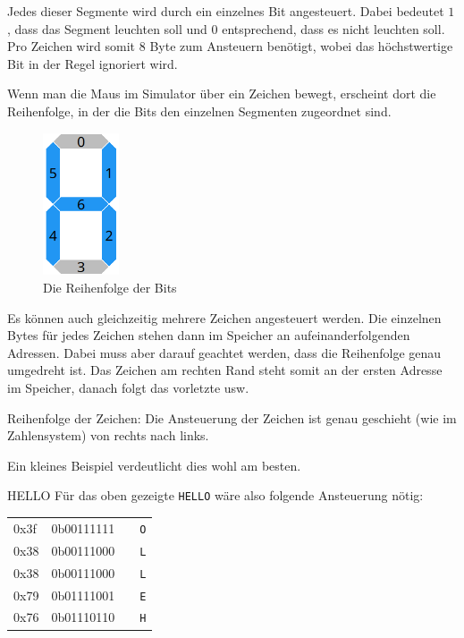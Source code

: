 Jedes dieser Segmente wird durch ein einzelnes Bit angesteuert. Dabei bedeutet $1$, dass das Segment leuchten soll und $0$ entsprechend, dass es nicht leuchten soll.
Pro Zeichen wird somit 8 Byte zum Ansteuern benötigt, wobei das höchstwertige Bit in der Regel ignoriert wird.

Wenn man die Maus im Simulator über ein Zeichen bewegt, erscheint dort die Reihenfolge, in der die Bits den einzelnen Segmenten zugeordnet sind.

\begin{figure}[ht]
	\centering
  \includegraphics[width=0.2\textwidth]{Images/7-Segment_Hover}
	\caption{Die Reihenfolge der Bits}
	\label{7-Segment_Hover}
\end{figure}

Es können auch gleichzeitig mehrere Zeichen angesteuert werden. Die einzelnen Bytes für jedes Zeichen stehen dann im Speicher an aufeinanderfolgenden Adressen.
Dabei muss aber darauf geachtet werden, dass die Reihenfolge genau umgedreht ist. Das Zeichen am rechten Rand steht somit an der ersten Adresse im Speicher,
danach folgt das vorletzte usw.

\begin{warningblock}
Reihenfolge der Zeichen: Die Ansteuerung der Zeichen ist genau geschieht (wie im Zahlensystem) von rechts nach links.
\end{warningblock}

Ein kleines Beispiel verdeutlicht dies wohl am besten.

\begin{exampleblock}{HELLO}
	Für das oben gezeigte \texttt{HELLO} wäre also folgende Ansteuerung nötig:\\
	\begin{tabular}{llll}
	0x3f & 0b00111111 & & \texttt{O}\\
	0x38 & 0b00111000 & & \texttt{L}\\
	0x38 & 0b00111000 & & \texttt{L}\\
	0x79 & 0b01111001 & & \texttt{E}\\
	0x76 & 0b01110110 & & \texttt{H}\\
	\end{tabular}
\end{exampleblock}

